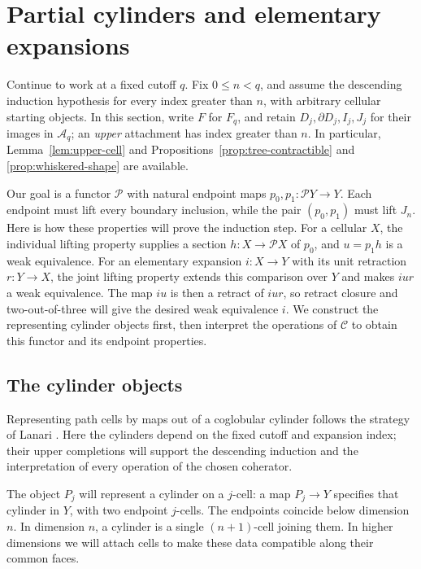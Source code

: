 \section{Partial cylinders and elementary expansions}
\label{sec:partial-cylinders}

Continue to work at a fixed cutoff \(q\).  Fix \(0\le n<q\), and
assume the descending induction hypothesis for every index greater than
\(n\), with arbitrary cellular starting objects.  In this section,
write \(F\) for \(F_q\), and retain \(D_j,\partial D_j,I_j,J_j\)
for their images in \(\mathcal A_q\); an \emph{upper} attachment has index greater than
\(n\).  In particular, Lemma~\ref{lem:upper-cell} and
Propositions~\ref{prop:tree-contractible} and
\ref{prop:whiskered-shape} are available.

Our goal is a functor \(\mathcal P\) with natural endpoint maps
\(p_0,p_1:\mathcal P Y\to Y\).  Each endpoint must lift every
boundary inclusion, while the pair \((p_0,p_1)\) must lift \(J_n\).
Here is how these properties will prove the induction step.  For a
cellular \(X\), the individual lifting property supplies a section
\(h:X\to\mathcal P X\) of \(p_0\), and \(u=p_1h\) is a weak
equivalence.  For an elementary expansion \(i:X\to Y\) with its
unit retraction \(r:Y\to X\), the joint lifting property extends
this comparison over \(Y\) and makes \(iur\) a weak equivalence.
The map \(iu\) is then a retract of \(iur\), so retract closure
and two-out-of-three will give the desired weak equivalence \(i\).
We construct the representing cylinder objects first, then interpret
the operations of \(\mathcal C\) to obtain this functor and its
endpoint properties.

\subsection{The cylinder objects}

Representing path cells by maps out of a coglobular cylinder follows
the strategy of Lanari
\cite[Definitions~5.2--5.3 and~6.1]{Lanari2020}.
Here the cylinders depend on the fixed cutoff and expansion index;
their upper completions will support the descending induction and
the interpretation of every operation of the chosen coherator.

The object \(P_j\) will represent a cylinder on a \(j\)-cell:
a map \(P_j\to Y\) specifies that cylinder in \(Y\), with two
endpoint \(j\)-cells.  The endpoints coincide below dimension \(n\).
In dimension \(n\), a cylinder is a single \((n+1)\)-cell joining
them.  In higher dimensions we will attach cells to make these data
compatible along their common faces.

